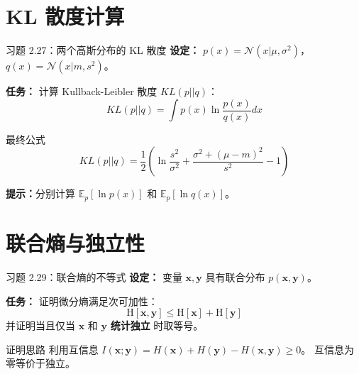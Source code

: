 \documentclass[12pt, aspectratio=169]{beamer}
\begin{document}
\section{KL 散度计算}
\begin{frame}{习题 2.27：两个高斯分布的 KL 散度}
    \textbf{设定：}
    $p(x)=\mathcal{N}(x | \mu, \sigma^{2})$， $q(x)=\mathcal{N}(x | m, s^{2})$。
    
    \textbf{任务：}
    计算 Kullback-Leibler 散度 $KL(p || q)$：
    \[ KL(p||q) = \int p(x) \ln \frac{p(x)}{q(x)} dx \]
    
    \begin{block}{最终公式}
        \[
        KL(p||q) = \frac{1}{2} \left( \ln\frac{s^2}{\sigma^2} + \frac{\sigma^2 + (\mu-m)^2}{s^2} - 1 \right)
        \]
    \end{block}
    \textbf{提示：}分别计算 $\mathbb{E}_p[\ln p(x)]$ 和 $\mathbb{E}_p[\ln q(x)]$。
\end{frame}

\section{联合熵与独立性}
\begin{frame}{习题 2.29：联合熵的不等式}
    \textbf{设定：}
    变量 $\mathbf{x}, \mathbf{y}$ 具有联合分布 $p(\mathbf{x}, \mathbf{y})$。
    
    \textbf{任务：}
    证明微分熵满足次可加性：
    \begin{equation}
        \mathrm{H}[\mathbf{x}, \mathbf{y}] \leqslant \mathrm{H}[\mathbf{x}]+\mathrm{H}[\mathbf{y}]
    \end{equation}
    并证明当且仅当 $\mathbf{x}$ 和 $\mathbf{y}$ \textbf{统计独立} 时取等号。
    
    \begin{alertblock}{证明思路}
        利用互信息 $I(\mathbf{x};\mathbf{y}) = H(\mathbf{x}) + H(\mathbf{y}) - H(\mathbf{x}, \mathbf{y}) \geqslant 0$。
        互信息为零等价于独立。
    \end{alertblock}
\end{frame}

\end{document}
